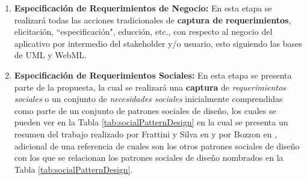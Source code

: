 \documentclass[oneside,12pt,a4paper]{memoir}%
\begin{document}
	\begin{enumerate}
	  \item \textbf{Especificaci\'on de Requerimientos de Negocio:} En esta etapa se
	  realizar\'a todas las acciones tradicionales de \textbf{captura de
	  requerimientos}, elicitaci\'on, ``especificaci\'on", educci\'on, etc., con
	  respecto al negocio del aplicativo por intermedio del stakeholder y/o
	  usuario, esto siguiendo las bases de \ac{UML} y \ac{WebML}.
	  \item \textbf{Especificaci\'on de Requerimientos Sociales:} En esta etapa
	  se presenta parte de la propuesta, la cual se realizar\'a una
	  \textbf{captura} de \textit{requerimientos sociales} o un conjunto de
	  \textit{necesidades sociales} inicialmente comprendidas como parte de un
	  conjunto de patrones sociales de dise\~no, los cuales se pueden ver en
	  la Tabla \ref{tab:socialPatternDesign} en la cual se presenta un resumen del
	  trabajo realizado por Frattini y Silva en \cite{Frattini2007} y por Bozzon en
	  \cite{Bozzon2009}, adicional de una referencia de cuales son los otros
	  patrones sociales de dise\~no con los que se relacionan los patrones sociales
	  de dise\~no nombrados en la Tabla \ref{tab:socialPatternDesign}.
	  

\end{enumerate}
\end{document}

